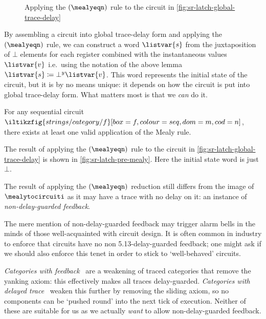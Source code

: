 \documentclass{lmcs}
\begin{document}
\begin{figure}
    \centering
    \caption{
        Applying the \((\mealyeqn)\) rule to the circuit in
        \autoref{fig:sr-latch-global-trace-delay}
    }
    \label{fig:sr-latch-pre-mealy}
\end{figure}

By assembling a circuit into global trace-delay form and
applying the \((\mealyeqn)\) rule, we can construct a word \(\listvar{s}\)
from the juxtaposition of \(\bot\) elements for each register combined with
the instantaneous values \(\listvar{v}\) i.e.\ using the notation of the above
lemma \(\listvar{s} \coloneqq \bot^y\listvar{v}\).
This word represents the initial state of the circuit, but it is by no means
unique: it depends on how the circuit is put into global trace-delay form.
What matters most is that we \emph{can} do it.

\begin{cor}
    For any sequential circuit \(
    \iltikzfig{strings/category/f}[box=f, colour=seq, dom=m, cod=n]
    \), there exists at least one valid application of the Mealy rule.
\end{cor}

\begin{exa}
    The result of applying the \((\mealyeqn)\) rule to the circuit in
    \autoref{fig:sr-latch-global-trace-delay} is shown in
    \autoref{fig:sr-latch-pre-mealy}.
    Here the initial state word is just \(\bot\).
\end{exa}

The result of applying the \((\mealyeqn)\) reduction still differs from the
image of \(\mealytocircuiti\) as it may have a trace with no delay on it: an
instance of \emph{non-delay-guarded feedback}.

The mere mention of non-delay-guarded feedback may trigger alarm bells in
the minds of those well-acquainted with circuit design.
It is often common in industry to enforce that circuits have no
non 5.13-delay-guarded feedback; one might ask if we should also enforce this
tenet in order to stick to `well-behaved' circuits.

\begin{rem}
    \emph{Categories with feedback}~\cite{katis2002feedback} are a weakening of
    traced categories that remove the yanking axiom: this effectively makes all
    traces delay-guarded.
    \emph{Categories with delayed trace}~\cite{sprunger2019differentiable}
    weaken this further by removing the sliding axiom, so no components can be
    `pushed round' into the next tick of execution.
    Neither of these are suitable for us as we actually \emph{want} to allow
    non-delay-guarded feedback.
\end{rem}
\end{document}
